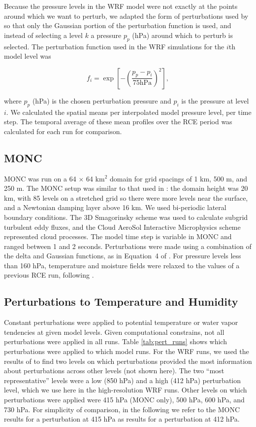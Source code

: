 \documentclass[draft]{agujournal2019}
\begin{document}
Because the pressure levels in the WRF model were not exactly at the points
around which we want to perturb, we adapted the form of perturbations used by
 so that only the Gaussian portion of the perturbation
function is used, and instead of selecting a level $k$ a pressure $p_p$ (hPa)
around which to perturb is selected. The perturbation function used in the WRF
simulations for the $i$th model level was

$$
f_i = \exp\left[ - \left( \frac{p_p - p_i}{75 \textrm{hPa}}\right)^2 \right],
$$

\noindent where $p_p$ (hPa) is the chosen perturbation pressure and $p_i$ is the
pressure at level $i$. We calculated the spatial means per interpolated model
pressure level, per time step. The temporal average of these mean profiles over
the RCE period was calculated for each run for comparison.

\subsection{MONC}

MONC was run on a 64 $\times$ 64 km$^2$ domain for grid spacings of 1 km, 500 m,
and 250 m. The MONC setup was similar to that used in :
the domain height was 20 km, with 85 levels on a stretched grid so there were
more levels near the surface, and a Newtonian damping layer above 16 km. We used
bi-periodic lateral boundary conditions. The 3D Smagorinsky scheme was used to
calculate subgrid turbulent eddy fluxes, and the Cloud AeroSol Interactive
Microphysics \cite<CASIM, see>{field23} scheme represented cloud processes. The
model time step is variable in MONC and ranged between 1 and 2 seconds.
Perturbations were made using a combination of the delta and Gaussian functions,
as in Equation~4 of . For pressure levels less than 160
hPa, temperature and moisture fields were relaxed to the values of a previous
RCE run, following \cite{Herman_JAMES_2013}.

\subsection{Perturbations to Temperature and Humidity}

Constant perturbations were applied to potential temperature or water vapor
tendencies at given model levels. Given computational constrains, not all
perturbations were applied in all runs.  Table \ref{tab:pert_runs} shows which
perturbations were applied to which model runs. For the WRF runs, we used the
results of  to find two levels on which perturbations
provided the most information about perturbations across other levels (not shown
here). The two ``most representative'' levels were a low (850 hPa) and a high
(412 hPa) perturbation level, which we use here in the high-resolution WRF runs.
Other levels on which perturbations were applied were 415 hPa (MONC only), 500
hPa, 600 hPa, and 730 hPa. For simplicity of comparison, in the following we
refer to the MONC results for a perturbation at 415 hPa as results for a
perturbation at 412 hPa.
\end{document}
